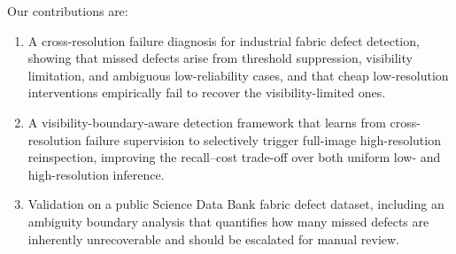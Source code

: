 Our contributions are:
\begin{enumerate}[leftmargin=1.5em]
\item A cross-resolution failure diagnosis for industrial fabric defect
detection, showing that missed defects arise from threshold suppression,
visibility limitation, and ambiguous low-reliability cases, and that cheap
low-resolution interventions empirically fail to recover the visibility-limited
ones.
\item A visibility-boundary-aware detection framework that learns from
cross-resolution failure supervision to selectively trigger full-image
high-resolution reinspection, improving the recall--cost trade-off over both
uniform low- and high-resolution inference.
\item Validation on a public Science Data Bank fabric defect dataset, including
an ambiguity boundary analysis that quantifies how many missed defects are
inherently unrecoverable and should be escalated for manual review.
\end{enumerate}
